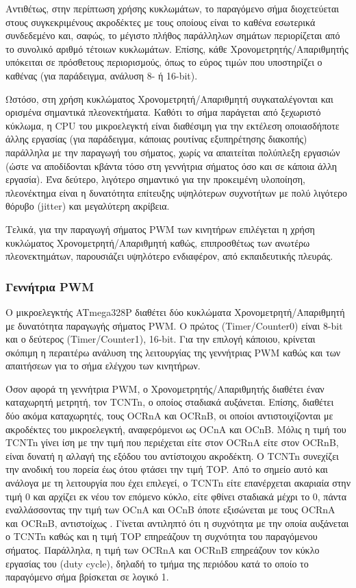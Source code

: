 Αντιθέτως, στην περίπτωση χρήσης κυκλωμάτων, το παραγόμενο σήμα διοχετεύεται
στους συγκεκριμένους ακροδέκτες με τους οποίους είναι το καθένα εσωτερικά
συνδεδεμένο και, σαφώς, το μέγιστο πλήθος παράλληλων σημάτων περιορίζεται από το
συνολικό αριθμό τέτοιων κυκλωμάτων. Επίσης, κάθε Χρονομετρητής\slash Απαριθμητής
υπόκειται σε πρόσθετους περιορισμούς, όπως το εύρος τιμών που υποστηρίζει ο
καθένας (για παράδειγμα, ανάλυση 8- ή 16-bit).

Ωστόσο, στη χρήση κυκλώματος Χρονομετρητή\slash Απαριθμητή συγκαταλέγονται και
ορισμένα σημαντικά πλεονεκτήματα.
Καθότι το σήμα παράγεται από ξεχωριστό κύκλωμα, η CPU του μικροελεγκτή είναι
διαθέσιμη για την εκτέλεση οποιασδήποτε άλλης εργασίας (για παράδειγμα, κάποιας
ρουτίνας εξυπηρέτησης διακοπής) παράλληλα με την παραγωγή του σήματος, χωρίς να
απαιτείται πολύπλεξη εργασιών (ώστε να αποδίδονται κβάντα τόσο στη γεννήτρια
σήματος όσο και σε κάποια άλλη εργασία). Ένα δεύτερο, λιγότερο σημαντικό για την
προκειμένη υλοποίηση, πλεονέκτημα είναι η δυνατότητα επίτευξης υψηλότερων
συχνοτήτων με πολύ λιγότερο θόρυβο (\textenglish{jitter}) και μεγαλύτερη
ακρίβεια.

Τελικά, για την παραγωγή σήματος PWM των κινητήρων επιλέγεται η χρήση κυκλώματος
Χρονομετρητή\slash Απαριθμητή καθώς, επιπροσθέτως των ανωτέρω πλεονεκτημάτων,
παρουσιάζει υψηλότερο ενδιαφέρον, από εκπαιδευτικής πλευράς.

\subsubsection{Γεννήτρια PWM}

Ο μικροελεγκτής ATmega328P διαθέτει δύο κυκλώματα Χρονομετρητή\slash Απαριθμητή
με δυνατότητα παραγωγής σήματος PWM. Ο πρώτος (Timer\slash Counter0) είναι 8-bit
και ο δεύτερος (Timer\slash Counter1), 16-bit. Για την επιλογή κάποιου, κρίνεται
σκόπιμη η περαιτέρω ανάλυση της λειτουργίας της γεννήτριας PWM καθώς και των
απαιτήσεων για το σήμα ελέγχου των κινητήρων.

Όσον αφορά τη γεννήτρια PWM, ο Χρονομετρητής\slash Απαριθμητής διαθέτει έναν
καταχωρητή μετρητή, τον TCNTn, ο οποίος σταδιακά αυξάνεται. Επίσης, διαθέτει
δύο ακόμα καταχωρητές, τους OCRnA και OCRnB, οι οποίοι αντιστοιχίζονται με
ακροδέκτες του μικροελεγκτή, αναφερόμενοι ως OCnA και OCnB. Μόλις η τιμή του
TCNTn γίνει ίση με την τιμή που περιέχεται είτε στον OCRnA είτε στον OCRnB,
είναι δυνατή η αλλαγή της εξόδου του αντίστοιχου ακροδέκτη. Ο TCNTn συνεχίζει
την ανοδική του πορεία έως ότου φτάσει την τιμή TOP. Από το σημείο αυτό και
ανάλογα με τη λειτουργία που έχει επιλεγεί, ο TCNTn είτε επανέρχεται ακαριαία
στην τιμή 0 και αρχίζει εκ νέου τον επόμενο κύκλο, είτε φθίνει σταδιακά μέχρι το
0, πάντα εναλλάσσοντας την τιμή των OCnA και OCnB όποτε εξισώνεται με τους OCRnA
και OCRnB, αντιστοίχως \parencite[100--102,124--129]{atmel13}.
Γίνεται αντιληπτό ότι η συχνότητα με την οποία αυξάνεται ο TCNTn καθώς και η
τιμή TOP επηρεάζουν τη συχνότητα του παραγόμενου σήματος. Παράλληλα, η τιμή των
OCRnA και OCRnB επηρεάζουν τον κύκλο εργασίας του (\textenglish{duty cycle}),
δηλαδή το τμήμα της περιόδου κατά το οποίο το παραγόμενο σήμα βρίσκεται σε
λογικό 1.

